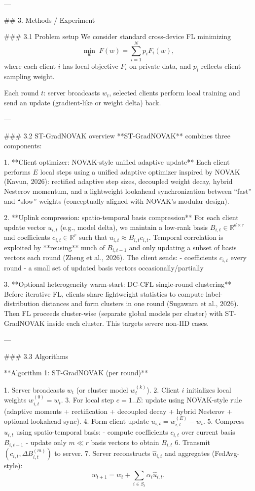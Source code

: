 ---

## 3. Methods / Experiment  

### 3.1 Problem setup  
We consider standard cross-device FL minimizing  
\[
\min_w \; F(w)=\sum_{i=1}^N p_i F_i(w),
\]
where each client \(i\) has local objective \(F_i\) on private data, and \(p_i\) reflects client sampling weight.

Each round \(t\): server broadcasts \(w_t\), selected clients perform local training and send an update (gradient-like or weight delta) back.

---

### 3.2 ST-GradNOVAK overview  
**ST-GradNOVAK** combines three components:

1. **Client optimizer: NOVAK-style unified adaptive update**  
   Each client performs \(E\) local steps using a unified adaptive optimizer inspired by NOVAK (Kavun, 2026): rectified adaptive step sizes, decoupled weight decay, hybrid Nesterov momentum, and a lightweight lookahead synchronization between “fast” and “slow” weights (conceptually aligned with NOVAK’s modular design).

2. **Uplink compression: spatio-temporal basis compression**  
   For each client update vector \(u_{i,t}\) (e.g., model delta), we maintain a low-rank basis \(B_{i,t}\in \mathbb{R}^{d\times r}\) and coefficients \(c_{i,t}\in\mathbb{R}^r\) such that \(u_{i,t}\approx B_{i,t}c_{i,t}\).  
   Temporal correlation is exploited by **reusing** much of \(B_{i,t-1}\) and only updating a subset of basis vectors each round (Zheng et al., 2026). The client sends:
   - coefficients \(c_{i,t}\) every round  
   - a small set of updated basis vectors occasionally/partially

3. **Optional heterogeneity warm-start: DC-CFL single-round clustering**  
   Before iterative FL, clients share lightweight statistics to compute label-distribution distances and form clusters in one round (Sugawara et al., 2026). Then FL proceeds cluster-wise (separate global models per cluster) with ST-GradNOVAK inside each cluster. This targets severe non-IID cases.

---

### 3.3 Algorithms  

**Algorithm 1: ST-GradNOVAK (per round)**

1. Server broadcasts \(w_t\) (or cluster model \(w_t^{(k)}\)).  
2. Client \(i\) initializes local weights \(w_{i,t}^{(0)} = w_t\).  
3. For local step \(e=1..E\): update using NOVAK-style rule (adaptive moments + rectification + decoupled decay + hybrid Nesterov + optional lookahead sync).  
4. Form client update \(u_{i,t} = w_{i,t}^{(E)} - w_t\).  
5. Compress \(u_{i,t}\) using spatio-temporal basis:
   - compute coefficients \(c_{i,t}\) over current basis \(B_{i,t-1}\)  
   - update only \(m\ll r\) basis vectors to obtain \(B_{i,t}\)  
6. Transmit \((c_{i,t}, \Delta B_{i,t}^{(m)})\) to server.  
7. Server reconstructs \(\hat u_{i,t}\) and aggregates (FedAvg-style):  
   \[
   w_{t+1} = w_t + \sum_{i\in S_t} \alpha_i \hat u_{i,t}.
   \]

